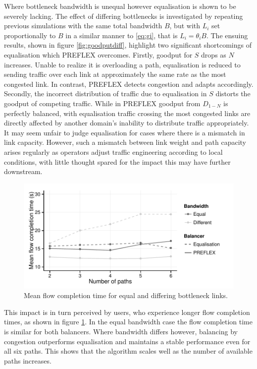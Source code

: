 Where bottleneck bandwidth is unequal however equalisation is shown to be severely lacking.
The effect of differing bottlenecks is investigated by repeating previous simulations with the same total bandwidth $B$, but with $L_i$ set proportionally to $B$ in a similar manner to \eqref{eq:gi}, that is $L_i = \theta_i B$.
The ensuing results, shown in figure \ref{fig:goodputdiff}, highlight two significant shortcomings of equalisation which \ac{PREFLEX} overcomes. 
Firstly, goodput for $S$ drops as $N$ increases. 
Unable to realize it is overloading a path, equalisation is reduced to sending traffic over each link at approximately the same rate as the most congested link. 
In contrast, \ac{PREFLEX} detects congestion and adapts accordingly. 
Secondly, the incorrect distribution of traffic due to equalisation in $S$ distorts the goodput of competing traffic. 
While in \ac{PREFLEX} goodput from $D_{1-N}$ is perfectly balanced, with equalisation traffic crossing the most congested links are directly affected by another domain's inability to distribute traffic appropriately.
It may seem unfair to judge equalisation for cases where there is a mismatch in link capacity.
However, such a mismatch between link weight and path capacity arises regularly as operators adjust traffic engineering according to local conditions, with little thought spared for the impact this may have further downstream.

\begin{figure}
    \centering
    \includegraphics[width=0.7\linewidth]{figures/cate/duration}
    \caption[Mean flow completion time.]{Mean flow completion time for equal and differing bottleneck links.}
    \label{fig:duration}
\end{figure}

This impact is in turn perceived by users, who experience longer flow completion times, as shown in figure \ref{fig:duration}. 
In the equal bandwidth case the flow completion time is similar for both balancers.  
Where bandwidth differs however, balancing by congestion outperforms equalisation and maintains a stable performance even for all six paths.  
This shows that the algorithm scales well as the number of available paths increases. 
